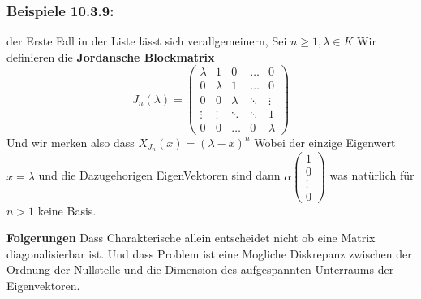 \documentclass{article}
\newcommand{\beispiel}[1]{\subsubsection*{Beispiele {#1}}}
\begin{document}
  \beispiel{10.3.9:} der Erste Fall in der Liste lässt sich verallgemeinern, Sei $n\ge1, \lambda \in K$ Wir definieren die \textbf{Jordansche Blockmatrix} \[J_n(\lambda)=\begin{pmatrix}
\lambda & 1 & 0 & \dots & 0 \\
0 & \lambda & 1 & \dots & 0 \\
0 & 0 & \lambda & \ddots & \vdots \\
\vdots & \vdots & \ddots & \ddots & 1 \\
0 & 0 & \dots & 0 & \lambda
\end{pmatrix}\]
Und wir merken also dass $X_{J_n}(x)=(\lambda-x)^n$ Wobei der einzige Eigenwert $x=\lambda$ und die Dazugehorigen EigenVektoren sind dann $\alpha \begin{pmatrix}1\\0\\\vdots\\0\end{pmatrix}$ was natürlich für $n>1$ keine Basis.

\textbf{Folgerungen} Dass Charakterische allein entscheidet nicht ob eine Matrix diagonalisierbar ist. Und dass Problem ist eine Mogliche Diskrepanz zwischen der Ordnung der Nullstelle und die Dimension des aufgespannten Unterraums der Eigenvektoren.
\end{document}
